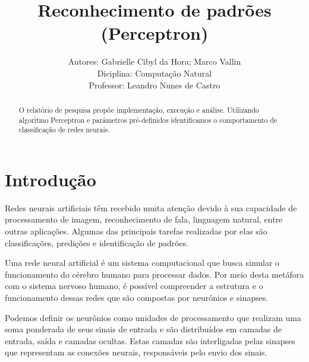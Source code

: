 \documentclass[runningheads]{llncs}
\begin{document}
%
\title{Reconhecimento de padrões (Perceptron)}
%
%
\pagestyle{plain}
\author{Autores: Gabrielle Cibyl da Hora; Marco Vallin \\ 
Diciplina: Computação Natural \\
Professor: Leandro Nunes de Castro} 
%
%
%
\maketitle              %
%
\begin{abstract}
O relatório de pesquisa propõe implementação, execução e análise. Utilizando algoritmo Perceptron e parâmetros pré-definidos identificamos o comportamento de classificação de redes neurais.

\end{abstract}
%
%
\section{Introdução}


Redes neurais artificiais têm recebido muita atenção devido à sua capacidade de processamento de imagem, reconhecimento de fala, linguagem natural, entre outras aplicações. Algumas das principais tarefas realizadas por elas são classificações, predições e identificação de padrões. \cite{Cao17} 

Uma rede neural artificial é um sistema computacional que busca simular o funcionamento do cérebro humano para processar dados. Por meio desta metáfora com o sistema nervoso humano, é possível compreender a estrutura e o funcionamento dessas redes que são compostas por neurônios e sinapses. \cite{Cao17}

Podemos definir os neurônios como unidades de processamento que realizam uma soma ponderada de seus sinais de entrada e são distribuídos em camadas de entrada, saída e camadas ocultas. Estas camadas são interligadas pelas sinapses que representam as conexões neurais, responsáveis pelo envio dos sinais. \cite{Cao17} \cite{M} 
\end{document}

